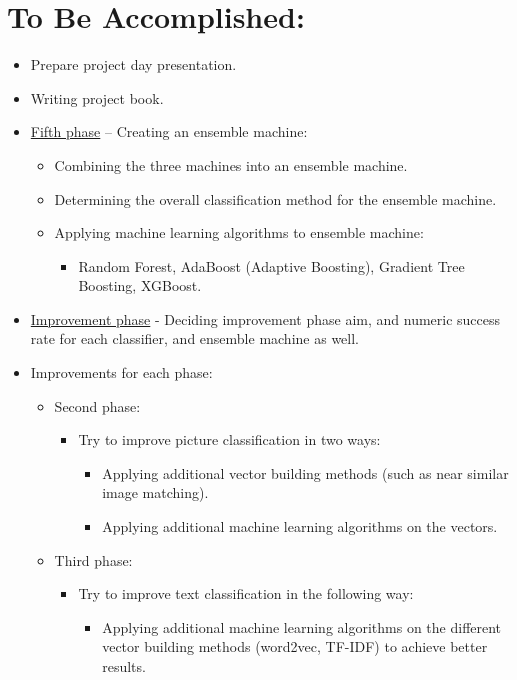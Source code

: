 \documentclass[10pt, a4paper]{article}
\begin{document}
\section{\large To Be Accomplished:}
\begin{itemize}
\item Prepare project day presentation.
\item Writing project book.
\item \underline{Fifth phase} – Creating an ensemble machine:
	\begin{itemize}
	\item Combining the three machines into an ensemble machine.
	\item  Determining the overall classification method for the ensemble machine.
	\item Applying machine learning algorithms to ensemble machine:
		\begin{itemize}
		\item Random Forest, AdaBoost (Adaptive Boosting), Gradient Tree Boosting, XGBoost.
		\end{itemize}
	\end{itemize}
\item \underline{Improvement phase} - Deciding improvement phase aim, and numeric success rate for each classifier, and ensemble machine as well.
\item Improvements for each phase:
	\begin{itemize}
	\item Second phase:
		\begin{itemize}
		\item Try to improve picture classification in two ways:
			\begin{itemize}
			\item Applying additional vector building methods (such as near similar image matching).
			\item Applying additional machine learning algorithms on the vectors.
			\end{itemize}
		\end{itemize}
		\item Third phase:
		\begin{itemize}
		\item Try to improve text classification in the following way:
			\begin{itemize}
			\item Applying additional machine learning algorithms on the different vector building methods (word2vec, TF-IDF) to achieve better results.

\end{itemize}
\end{itemize}
\end{itemize}
\end{itemize}
\end{document}
